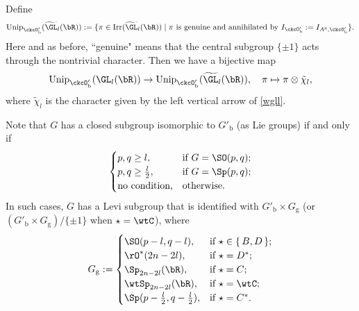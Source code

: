 \documentclass[12pt,a4paper]{amsart}
\newcommand{\oO}{\operatorname{O}}
\newcommand{\R}{\mathbb R}
\newcommand{\be}{\begin {equation}}
\newcommand{\ee}{\end {equation}}
\numberwithin{equation}{section}
\theoremstyle{remark}
\def\Irr{\mathrm{Irr}}
\def\Unip{\mathrm{Unip}}
\def\ckcOpb{\ckcO'_{\mathrm b}}
\def\Gpb{G'_{\mathrm b}}
\def\Gg{G_{\mathrm g}}
\begin{document}
Define
 \[
      \Unip_{\ckcOpb}(\widetilde{ \GL}_{l}(\bR)):=
       \{\pi\in \Irr(\widetilde{ \GL}_{l}(\bR))\mid \pi \textrm{ is genuine  and annihilated by } I_{\ckcOpb}:= I_{A^\R, \ckcOpb}\}.
       \]
        Here and as before, ``genuine" means that the central subgroup $\{\pm 1\}$ acts through the nontrivial character.  Then we have a bijective map
 \[
    \Unip_{\ckcOpb}(\GL_{l}(\bR))\rightarrow  \Unip_{\ckcOpb}(\widetilde{ \GL}_{l}(\bR)), \quad \pi\mapsto \pi\otimes \tilde \chi_l,
 \]
 where $\tilde \chi_l$ is the character given by the left vertical arrow of \eqref{wgll}.

Note that $G$ has a closed subgroup isomorphic to $\Gpb$ (as Lie groups) if and only if
\[
  \begin{cases}
    p,q\geq l, & \text{if $G = \SO(p,q)$};\\
    p,q\geq \frac{l}{2}, &  \text{if $G = \Sp(p,q)$};\\
    \text{no condition,} & \text{otherwise}.
  \end{cases}
\]
In such cases, $G$ has a Levi subgroup that is identified with $\Gpb\times \Gg$ (or   $(\Gpb\times \Gg)/\{\pm 1\} $ when $\star=\wtC$), where
\be\label{gg00}
  \Gg :=
  \begin{cases}
    \SO(p-l,q-l), & \textrm{if $\star\in \set{B,D}$};\\
    \rO^{*}(2n-2l), &\textrm{if $\star = D^{*}$};\\
    \Sp_{2n-2l}(\bR), &\textrm{if $\star = C$};\\
    \wtSp_{2n-2l}(\bR), &\textrm{if $\star = \wtC$};\\
    \Sp(p-\frac{l}{2},q-\frac{l}{2}), &\textrm{if $\star = C^{*}$}.\\
  \end{cases}
\ee
\end{document}
